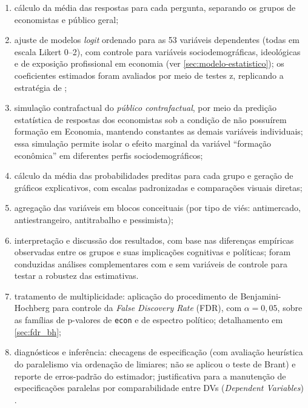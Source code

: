 \begin{enumerate}[label=\alph*)]
    \item cálculo da média das respostas para cada pergunta, separando os grupos de economistas e público geral;
    
    \item ajuste de modelos \textit{logit} ordenado para as 53 variáveis dependentes (todas em escala Likert 0–2), com controle para variáveis sociodemográficas, ideológicas e de exposição profissional em economia (ver \autoref{sec:modelo-estatistico}); os coeficientes estimados foram avaliados por meio de testes z, replicando a estratégia de ;
    
    \item simulação contrafactual do \textit{público contrafactual}, por meio da predição estatística de respostas dos economistas sob a condição de não possuírem formação em Economia, mantendo constantes as demais variáveis individuais; essa simulação permite isolar o efeito marginal da variável ``formação econômica'' em diferentes perfis sociodemográficos;
    
    \item cálculo da média das probabilidades preditas para cada grupo e geração de gráficos explicativos, com escalas padronizadas e comparações visuais diretas;
    
    \item agregação das variáveis em blocos conceituais (por tipo de viés: antimercado, antiestrangeiro, antitrabalho e pessimista);
    
    \item interpretação e discussão dos resultados, com base nas diferenças empíricas observadas entre os grupos e suas implicações cognitivas e políticas; foram conduzidas análises complementares com e sem variáveis de controle para testar a robustez das estimativas.

    \item tratamento de multiplicidade: aplicação do procedimento de Benjamini-Hochberg para controle da \textit{False Discovery Rate} (FDR), com $\alpha = 0{,}05$, sobre as famílias de p-valores de \texttt{econ} e de espectro político; detalhamento em \autoref{sec:fdr_bh};
    
    \item diagnósticos e inferência: checagens de especificação (com avaliação heurística do paralelismo via ordenação de limiares; não se aplicou o teste de Brant) e reporte de erros-padrão do estimador; justificativa para a manutenção de especificações paralelas por comparabilidade entre DVs (\textit{Dependent Variables}) \cite{stigum2003}.

\end{enumerate}

